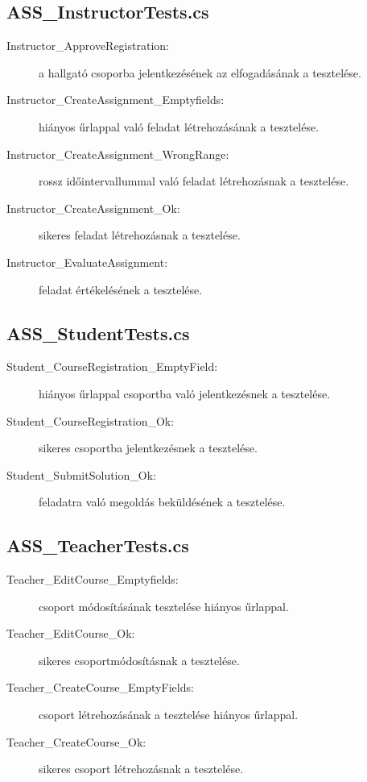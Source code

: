 \subsection{ASS\_InstructorTests.cs}
\begin{description}
    \item[Instructor\_ApproveRegistration:] a hallgató csoporba jelentkezésének az elfogadásának a tesztelése.
    \item[Instructor\_CreateAssignment\_Emptyfields:] hiányos űrlappal való feladat létrehozásának a tesztelése.
    \item[Instructor\_CreateAssignment\_WrongRange:] rossz időintervallummal való feladat létrehozásnak a tesztelése.
    \item[Instructor\_CreateAssignment\_Ok:] sikeres feladat létrehozásnak a tesztelése.
    \item[Instructor\_EvaluateAssignment:] feladat értékelésének a tesztelése.
\end{description}
\subsection{ASS\_StudentTests.cs}
\begin{description}
    \item[Student\_CourseRegistration\_EmptyField:] hiányos űrlappal csoportba való jelentkezésnek a tesztelése.
    \item[Student\_CourseRegistration\_Ok:] sikeres csoportba jelentkezésnek a tesztelése.
    \item[Student\_SubmitSolution\_Ok:] feladatra való megoldás beküldésének a tesztelése.
\end{description}
\subsection{ASS\_TeacherTests.cs}
\begin{description}
    \item[Teacher\_EditCourse\_Emptyfields:] csoport módosításának tesztelése hiányos űrlappal.
    \item[Teacher\_EditCourse\_Ok:] sikeres csoportmódosításnak a tesztelése.
    \item[Teacher\_CreateCourse\_EmptyFields:] csoport létrehozásának a tesztelése hiányos űrlappal.
    \item[Teacher\_CreateCourse\_Ok:] sikeres csoport létrehozásnak a tesztelése.
\end{description}